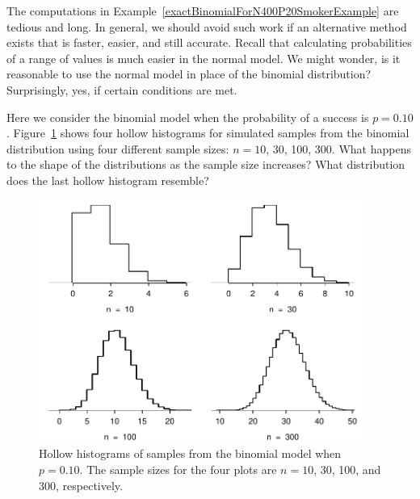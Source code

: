 The computations in Example~\ref{exactBinomialForN400P20SmokerExample} are tedious and long. In general, we should avoid such work if an alternative method exists that is faster, easier, and still accurate. Recall that calculating probabilities of a range of values is much easier in the normal model. We might wonder, is it reasonable to use the normal model in place of the binomial distribution? Surprisingly, yes, if certain conditions are met.

\begin{exercisewrap}
\begin{nexercise}
Here we consider the binomial model when the probability of a success is $p=0.10$. Figure~\ref{fourBinomialModelsShowingApproxToNormal} shows four hollow histograms for simulated samples from the binomial distribution using four different sample sizes: $n=10$, 30, 100, 300. What happens to the shape of the distributions as the sample size increases? What distribution does the last hollow histogram resemble?\footnotemark
\end{nexercise}
\end{exercisewrap}

\begin{figure}[h]
\centering
\includegraphics[width=0.95\textwidth]{ch_distributions/figures/fourBinomialModelsShowingApproxToNormal/fourBinomialModelsShowingApproxToNormal}
\caption{Hollow histograms of samples from the binomial model when $p=0.10$. The sample sizes for the four plots are $n=10$, 30, 100, and 300, respectively.}
\label{fourBinomialModelsShowingApproxToNormal}
\end{figure}

